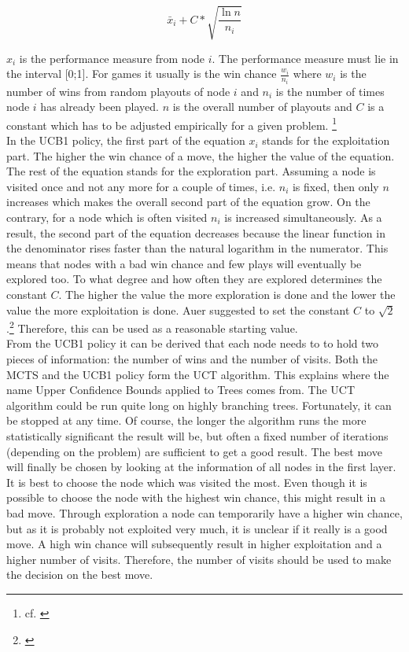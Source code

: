 \documentclass[german]{report}
\begin{document}
\begin{equation}
\label{eq:UCB1}
\bar{x}_{i} + C * \sqrt{\frac{\ln n}{n_{i}}}
\end{equation}

\(x_{i}\) is the performance measure from node \(i\). The performance measure
must lie in the interval [0;1]. For games it usually is the win chance
\(\frac{w_{i}}{n_{i}}\) where \(w_{i}\) is the number of wins from random
playouts of node \(i\) and \(n_{i}\) is the number of times node \(i\) has
already been played. \(n\) is the overall number of playouts and \(C\) is a
constant which has to be adjusted empirically for a given problem. \footnote{cf. \cite{thesis:uct}}\\

In the UCB1 policy, the first part of the equation \(x_{i}\) stands for the
exploitation part. The higher the win chance of a move, the higher the value of
the equation. The rest of the equation stands for the exploration part. Assuming
a node is visited once and not any more for a couple of times, i.e. \(n_{i}\) is
fixed, then only \(n\) increases which makes the overall second part of the
equation grow. On the contrary, for a node which is often visited \(n_{i}\) is
increased simultaneously. As a result, the second part of the equation decreases
because the linear function in the denominator rises faster than the natural
logarithm in the numerator. This means that nodes with a bad win chance and few
plays will eventually be explored too. To what degree and how often they are
explored determines the constant \(C\). The higher the value the more
exploration is done and the lower the value the more exploitation is done.
Auer suggested to set the constant \(C\) to
\(\sqrt{2}\).\footnote{\cite{paper:ucb1}} Therefore, this can be used as a
reasonable starting value.\\

From the UCB1 policy it can be derived that each node needs to to hold two
pieces of information: the number of wins and the number of visits.
Both the MCTS and the UCB1 policy form the UCT algorithm. This explains where
the name Upper Confidence Bounds applied to Trees comes from. The UCT algorithm
could be run quite long on highly branching trees. Fortunately, it can be
stopped at any time. Of course, the longer the algorithm runs the more
statistically significant the result will be, but often a fixed number of
iterations (depending on the problem) are sufficient to get a good result.
The best move will finally be chosen by looking at the information of all nodes
in the first layer. It is best to choose the node which was visited the most.
Even though it is possible to choose the node with the highest win chance, this
might result in a bad move. Through exploration a node can temporarily have a
higher win chance, but as it is probably not exploited very much, it is unclear
if it really is a good move. A high win chance will subsequently result in
higher exploitation and a higher number of visits. Therefore, the number of
visits should be used to make the decision on the best move.
\end{document}
